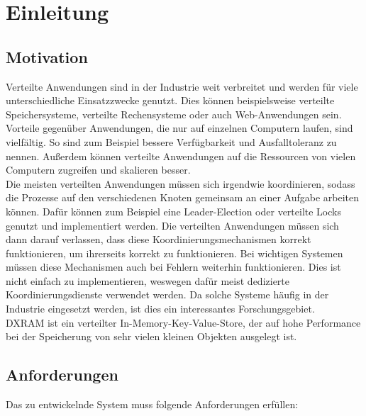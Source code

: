  \chapter{Einleitung}

\section{Motivation}

Verteilte Anwendungen sind in der Industrie weit verbreitet und werden für viele unterschiedliche Einsatzzwecke genutzt. Dies können beispielsweise verteilte Speichersysteme, verteilte Rechensysteme oder auch Web-Anwendungen sein. Vorteile gegenüber Anwendungen, die nur auf einzelnen Computern laufen, sind vielfältig. So sind zum Beispiel bessere Verfügbarkeit und Ausfalltoleranz zu nennen. Außerdem können verteilte Anwendungen auf die Ressourcen von vielen Computern zugreifen und skalieren besser. \\
Die meisten verteilten Anwendungen müssen sich irgendwie koordinieren, sodass die Prozesse auf den verschiedenen Knoten gemeinsam an einer Aufgabe arbeiten können. Dafür können zum Beispiel eine Leader-Election oder verteilte Locks genutzt und implementiert werden. Die verteilten Anwendungen müssen sich dann darauf verlassen, dass diese Koordinierungsmechanismen korrekt funktionieren, um ihrerseits korrekt zu funktionieren. Bei wichtigen Systemen müssen diese Mechanismen auch bei Fehlern weiterhin funktionieren. Dies ist nicht einfach zu implementieren, weswegen dafür meist dedizierte Koordinierungsdienste verwendet werden. Da solche Systeme häufig in der Industrie eingesetzt werden, ist dies ein interessantes Forschungsgebiet. \\
DXRAM \cite{dxram} ist ein verteilter In-Memory-Key-Value-Store, der auf hohe Performance bei der Speicherung von sehr vielen kleinen Objekten ausgelegt ist. 

\section{Anforderungen}

Das zu entwickelnde System muss folgende Anforderungen erfüllen:

